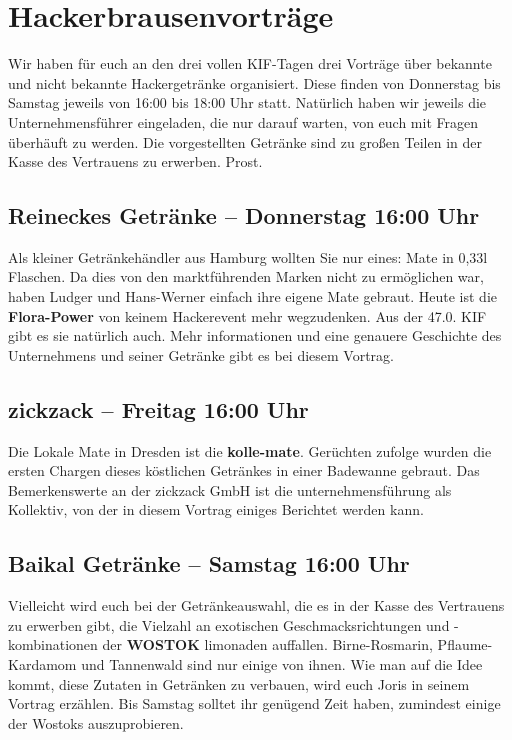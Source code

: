
\section*{Hackerbrausenvorträge}
Wir haben für euch an den drei vollen KIF-Tagen drei Vorträge über bekannte und nicht bekannte
Hackergetränke organisiert. Diese finden von Donnerstag bis Samstag jeweils von 16:00 bis 18:00 Uhr
statt. Natürlich haben wir jeweils die Unternehmensführer eingeladen, die nur darauf warten, von
euch mit Fragen überhäuft zu werden. Die vorgestellten Getränke sind zu großen Teilen in der Kasse
des Vertrauens zu erwerben. Prost.

\subsection*{Reineckes Getränke -- Donnerstag 16:00 Uhr}
Als kleiner Getränkehändler aus Hamburg wollten Sie nur eines: Mate in 0,33l Flaschen. Da dies von
den marktführenden Marken nicht zu ermöglichen war, haben Ludger und Hans-Werner einfach ihre eigene
Mate gebraut. Heute ist die \textbf{Flora-Power} von keinem Hackerevent mehr wegzudenken. Aus der
47.0. KIF gibt es sie natürlich auch. Mehr informationen und eine genauere Geschichte des
Unternehmens und seiner Getränke gibt es bei diesem Vortrag.

\subsection*{zickzack -- Freitag 16:00 Uhr}
Die Lokale Mate in Dresden ist die \textbf{kolle-mate}. Gerüchten zufolge wurden die ersten Chargen
dieses köstlichen Getränkes in einer Badewanne gebraut. Das Bemerkenswerte an der zickzack GmbH ist
die unternehmensführung als Kollektiv, von der in diesem Vortrag einiges Berichtet werden kann.

\subsection*{Baikal Getränke -- Samstag 16:00 Uhr}
Vielleicht wird euch bei der Getränkeauswahl, die es in der Kasse des Vertrauens zu erwerben gibt,
die Vielzahl an exotischen Geschmacksrichtungen und -kombinationen der \textbf{WOSTOK} limonaden
auffallen. Birne-Rosmarin, Pflaume-Kardamom und Tannenwald sind nur einige von ihnen. Wie man auf
die Idee kommt, diese Zutaten in Getränken zu verbauen, wird euch Joris in seinem Vortrag erzählen.
Bis Samstag solltet ihr genügend Zeit haben, zumindest einige der Wostoks auszuprobieren.
